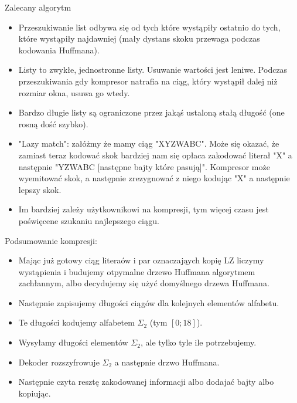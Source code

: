 \documentclass[presentation]{beamer}
\begin{document}
\begin{frame}[label={sec:orgf89c2ff}]{Zalecany algorytm}
\begin{itemize}
\item Przeszukiwanie list odbywa się od tych które wystąpiły ostatnio
do tych, które wystąpiły najdawniej (mały dystans skoku przewaga
podczas kodowania Huffmana).
\item Listy to zwykłe, jednostronne listy. Usuwanie wartości jest
leniwe. Podczas przeszukiwania gdy kompresor natrafia na ciąg,
który wystąpił dalej niż rozmiar okna, usuwa go wtedy.
\item Bardzo długie listy są ograniczone przez jakąś ustaloną stałą
długość (one rosną dość szybko).
\item "Lazy match": załóżmy że mamy ciąg "XYZWABC". Może się okazać, że
zamiast teraz kodować skok bardziej nam się opłaca zakodować
literał "X" a następnie "YZWABC [następne bajty które pasują]".
Kompresor może wyemitować skok, a następnie zrezygnować z niego
kodując "X" a następnie lepszy skok.
\item Im bardziej zależy użytkownikowi na kompresji, tym więcej czasu
jest poświęcene szukaniu najlepszego ciągu.
\end{itemize}
\end{frame}

\begin{frame}[label={sec:org8b8d72f}]{Podsumowanie kompresji:}
\begin{itemize}
\item Mając już gotowy ciąg literaów i par oznaczająych kopię LZ
liczymy wystąpienia i budujemy otpymalne drzewo Huffmana
algorytmem zachłannym, albo decydujemy się użyć domyślnego drzewa
Huffmana.
\item Następnie zapisujemy długości ciągów dla kolejnych elementów alfabetu.
\item Te długości kodujemy alfabetem \(\Sigma_{\text{2}}\) (tym \([0; 18]\)).
\item Wysyłamy długości elementów \(\Sigma_{\text{2}}\), ale tylko tyle ile potrzebujemy.
\item Dekoder rozszyfrowuje \(\Sigma_{\text{2}}\) a następnie drzwo Huffmana.
\item Następnie czyta resztę zakodowanej informacji albo dodajać bajty
albo kopiując.
\end{itemize}
\end{frame}
\end{document}
